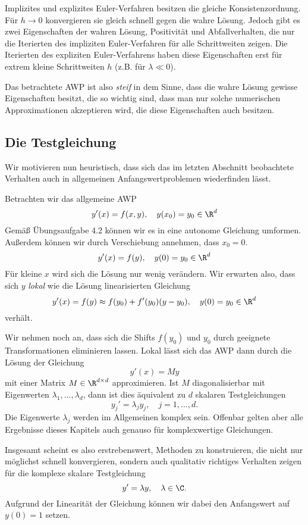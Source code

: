 \documentclass[
]{mycourse}
\theoremstyle{mythm}
\theoremstyle{break}
\begin{document}
Implizites und explizites Euler-Verfahren besitzen die gleiche Konsistenzordnung. Für $h\to 0$ konvergieren sie gleich schnell gegen die wahre Lösung. Jedoch gibt es zwei Eigenschaften der wahren Lösung, Positivität und Abfallverhalten, 
die nur die Iterierten des impliziten Euler-Verfahren für alle Schrittweiten zeigen. Die Iterierten des expliziten Euler-Verfahrens haben diese Eigenschaften erst für extrem kleine Schrittweiten $h$ (z.B. für $\lambda \ll 0$).

Das betrachtete AWP ist also \emph{steif} in dem Sinne, dass die wahre Lösung gewisse Eigenschaften besitzt, die 
so wichtig sind, dass man nur solche numerischen Approximationen akzeptieren wird, die diese Eigenschaften auch besitzen.

\subsection{Die Testgleichung}

Wir motivieren nun heuristisch, dass sich das im letzten Abschnitt beobachtete Verhalten
auch in allgemeinen Anfangswertproblemen wiederfinden lässt.


Betrachten wir das allgemeine AWP
\[
y'(x)=f(x,y), \quad y(x_0)=y_0\in \R^d
\]
Gemäß Übungsaufgabe 4.2 können wir es in eine autonome Gleichung umformen. Außerdem können wir durch Verschiebung annehmen, 
dass $x_0=0$.
\[
y'(x)=f(y),  \quad y(0)=y_0\in \R^d
\]
Für kleine $x$ wird sich die Lösung nur wenig verändern. Wir erwarten also, dass sich 
$y$ \emph{lokal} wie die Lösung linearisierten Gleichung
\[
y'(x)=f(y)\approx f(y_0)+f'(y_0)(y-y_0), \quad y(0)=y_0\in \R^d
\]
verhält. 

Wir nehmen noch an, dass sich die Shifts $f(y_0)$ und $y_0$ durch geeignete Transformationen eliminieren lassen. 
Lokal lässt sich das AWP dann durch die Lösung der Gleichung 
\[
y'(x)=M y
\]
mit einer Matrix $M\in \R^{d\times d}$ approximieren. Ist $M$ diagonalisierbar mit Eigenwerten $\lambda_1,\ldots,\lambda_d$, dann ist dies äquivalent zu $d$ skalaren Testgleichungen
\[
y_j'=\lambda_j y_j, \quad j=1,\ldots,d.
\] 
Die Eigenwerte $\lambda_j$ werden im Allgemeinen komplex sein. Offenbar gelten aber alle Ergebnisse dieses Kapitels auch genauso für komplexwertige Gleichungen.

Insgesamt scheint es also erstrebenswert, Methoden zu konstruieren, die nicht nur möglichst schnell konvergieren, sondern auch
qualitativ richtiges Verhalten zeigen für die komplexe skalare Testgleichung
\[
y'=\lambda y, \quad \lambda\in \C.
\] 
Aufgrund der Linearität der Gleichung können wir dabei den Anfangswert auf $y(0)=1$ setzen.
\end{document}
